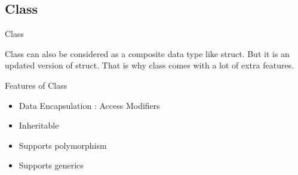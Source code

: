 \documentclass[newPxFont]{beamer}
\begin{document}
\endgroup

\subsection{Class}

\begin{frame}[allowframebreaks]{Class}

\alert{Class} can also be considered as a composite data type like \alert{struct}. But it is an updated version of struct. That is why class comes with a lot of extra features.

\begin{exampleblock}{Features of Class}
    \begin{itemize}
        \item{Data Encapsulation : Access Modifiers}
        \item{Inheritable}
        \item{Supports polymorphism}
        \item{Supports generics}
    \end{itemize}
\end{exampleblock}

\end{frame}
\end{document}
